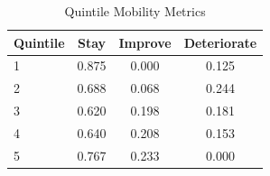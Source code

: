 \begin{table}
\caption{Quintile Mobility Metrics}
\label{tab:quintile_mobility}
\begin{tabular}{lccc}
\toprule
Quintile & Stay & Improve & Deteriorate \\
\midrule
1 & 0.875 & 0.000 & 0.125 \\
2 & 0.688 & 0.068 & 0.244 \\
3 & 0.620 & 0.198 & 0.181 \\
4 & 0.640 & 0.208 & 0.153 \\
5 & 0.767 & 0.233 & 0.000 \\
\bottomrule
\end{tabular}
\end{table}
